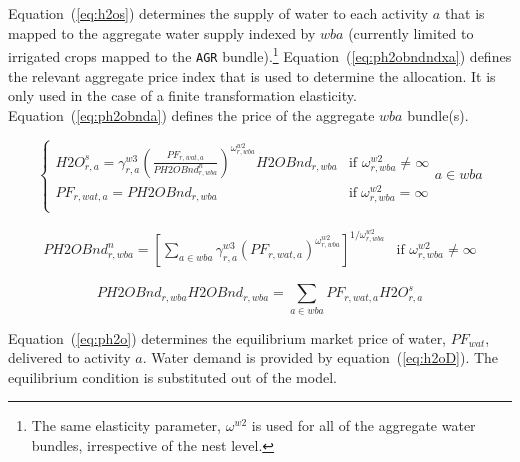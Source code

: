\documentclass[11pt,letterpaper]{report}
\begin{document}
Equation~(\ref{eq:h2os}) determines the supply of water to each activity $a$
that is mapped to the aggregate water supply indexed by $\mathit{wba}$
(currently limited to irrigated crops mapped to the \texttt{AGR}
bundle).\footnote{The same elasticity parameter, $\omega^{\mathit{w2}}$ is used
for all of the aggregate water bundles, irrespective of the nest level.}
Equation~(\ref{eq:ph2obndndxa}) defines the relevant aggregate price index that
is used to determine the allocation. It is only used in the case of a finite
transformation elasticity. Equation~(\ref{eq:ph2obnda}) defines the price of the
aggregate $\mathit{wba}$ bundle(s).

\begin{equation}
\label{eq:h2os}
\begin{cases}
   \mathit{H2O}^s_{r,\mathit{a}} =
      \gamma^{\mathit{w3}}_{r,\mathit{a}}
      \left( \frac{\mathit{PF}_{r,\mathit{wat},\mathit{a}}}
         {\mathit{PH2OBnd}^n_{r,\mathit{wba}}}
      \right)^{\omega^{\mathit{w2}}_{r,\mathit{wba}}}
      \mathit{H2OBnd}_{r,\mathit{wba}}
   & \textrm{if } \omega^{\mathit{w2}}_{r,\mathit{wba}} \ne \infty \\
   \mathit{PF}_{r,\mathit{wat},\mathit{a}} = \mathit{PH2OBnd}_{r,\mathit{wba}}
   & \textrm{if} \; \omega^{\mathit{w2}}_{r,\mathit{wba}} = \infty \\
\end{cases} {\mathit{a} \in \mathit{wba}}
\end{equation}

\begin{equation}
\label{eq:ph2obndndxa}
\begin{array}{*{20}{l}}
\mathit{PH2OBnd}^n_{r,\mathit{wba}} =
   \displaystyle \left[ \sum_{\mathit{a} \in \mathit{wba}}{
      \gamma^{\mathit{w3}}_{r,\mathit{a}}
      \left( \mathit{PF}_{r,\mathit{wat},\mathit{a}}
      \right)^{\omega^{\mathit{w2}}_{r,\mathit{wba}}}
   }\right]^{1/\omega^{\mathit{w2}}_{r,\mathit{wba}}}
& \textrm{if } \omega^{\mathit{w2}}_{r,\mathit{wba}} \ne \infty
\end{array}
\end{equation}

\begin{equation}
\label{eq:ph2obnda}
\mathit{PH2OBnd}_{r,\mathit{wba}} \mathit{H2OBnd}_{r,\mathit{wba}} =
   \sum_{\mathit{a}\in \mathit{wba}}{
      \mathit{PF}_{r,\mathit{wat},\mathit{a}} \mathit{H2O}^s_{r,\mathit{a}}
   }
\end{equation}

Equation~(\ref{eq:ph2o}) determines the equilibrium market price of water,
$\mathit{PF}_{\mathit{wat}}$, delivered to activity $a$. Water demand is
provided by equation~(\ref{eq:h2oD}). The equilibrium condition is substituted
out of the model.
\end{document}
